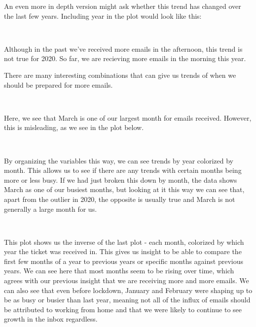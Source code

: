 \documentclass[11pt]{article}
\begin{document}
    An even more in depth version might ask whether this trend has changed
over the last few years. Including year in the plot would look like
this:

    \begin{center}
    \end{center}
    { \hspace*{\fill} \\}
    
    Although in the past we've received more emails in the afternoon, this
trend is not true for 2020. So far, we are recieving more emails in the
morning this year.

There are many interesting combinations that can give us trends of when
we should be prepared for more emails.

    \begin{center}
    \end{center}
    { \hspace*{\fill} \\}
    
    Here, we see that March is one of our largest month for emails received.
However, this is misleading, as we see in the plot below.

    \begin{center}
    \end{center}
    { \hspace*{\fill} \\}
    
    By organizing the variables this way, we can see trends by year
colorized by month. This allows us to see if there are any trends with
certain months being more or less busy. If we had just broken this down
by month, the data shows March as one of our busiest months, but looking
at it this way we can see that, apart from the outlier in 2020, the
opposite is usually true and March is not generally a large month for
us.

    \begin{center}
    \end{center}
    { \hspace*{\fill} \\}
    
    This plot shows us the inverse of the last plot - each month, colorized
by which year the ticket was received in. This gives us insight to be
able to compare the first few months of a year to previous years or
specific months against previous years. We can see here that most months
seem to be rising over time, which agrees with our previous insight that
we are receiving more and more emails. We can also see that even before
lockdown, January and February were shaping up to be as busy or busier
than last year, meaning not all of the influx of emails should be
attributed to working from home and that we were likely to continue to
see growth in the inbox regardless.
\end{document}
